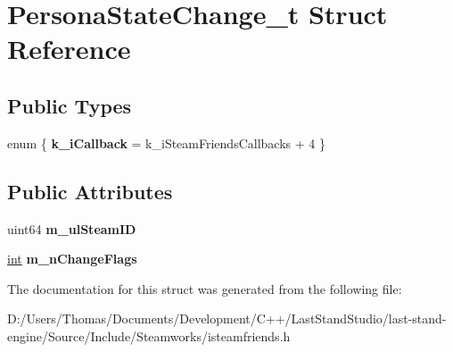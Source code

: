 \hypertarget{structPersonaStateChange__t}{}\section{Persona\+State\+Change\+\_\+t Struct Reference}
\label{structPersonaStateChange__t}
\subsection*{Public Types}
\begin{DoxyCompactItemize}
\item 
\hypertarget{structPersonaStateChange__t_a76fd7684f649e4329063c1a493fc16b0}{}enum \{ {\bfseries k\+\_\+i\+Callback} = k\+\_\+i\+Steam\+Friends\+Callbacks + 4
 \}\label{structPersonaStateChange__t_a76fd7684f649e4329063c1a493fc16b0}

\end{DoxyCompactItemize}
\subsection*{Public Attributes}
\begin{DoxyCompactItemize}
\item 
\hypertarget{structPersonaStateChange__t_afff92ef97236d8be7ab77288a6f0a0d0}{}uint64 {\bfseries m\+\_\+ul\+Steam\+I\+D}\label{structPersonaStateChange__t_afff92ef97236d8be7ab77288a6f0a0d0}

\item 
\hypertarget{structPersonaStateChange__t_a47a4d98424f704ed04c0545def9b18e2}{}\hyperlink{SDL__thread_8h_a6a64f9be4433e4de6e2f2f548cf3c08e}{int} {\bfseries m\+\_\+n\+Change\+Flags}\label{structPersonaStateChange__t_a47a4d98424f704ed04c0545def9b18e2}

\end{DoxyCompactItemize}


The documentation for this struct was generated from the following file\+:\begin{DoxyCompactItemize}
\item 
D\+:/\+Users/\+Thomas/\+Documents/\+Development/\+C++/\+Last\+Stand\+Studio/last-\/stand-\/engine/\+Source/\+Include/\+Steamworks/isteamfriends.\+h\end{DoxyCompactItemize}
